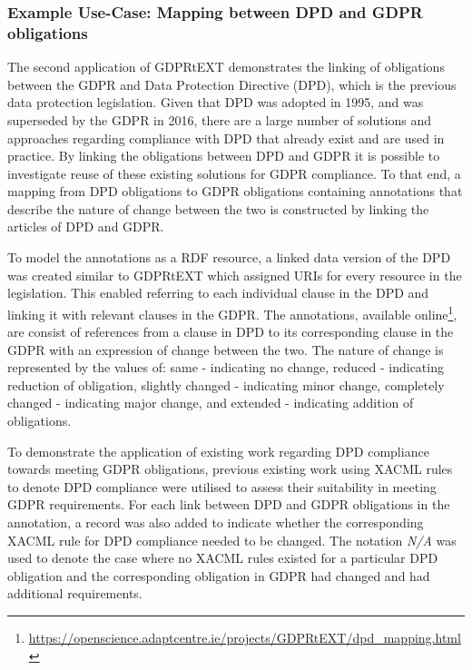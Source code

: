 \subsubsection{Example Use-Case: Mapping between DPD and GDPR obligations}
The second application of GDPRtEXT demonstrates the linking of obligations between the GDPR and Data Protection Directive (DPD), which is the previous data protection legislation. Given that DPD was adopted in 1995, and was superseded by the GDPR in 2016, there are a large number of solutions and approaches regarding compliance with DPD that already exist and are used in practice. By linking the obligations between DPD and GDPR it is possible to investigate reuse of these existing solutions for GDPR compliance. To that end, a mapping from DPD obligations to GDPR obligations containing annotations that describe the nature of change between the two is constructed by linking the articles of DPD and GDPR.

To model the annotations as a RDF resource, a linked data version of the DPD was created similar to GDPRtEXT which assigned URIs for every resource in the legislation. This enabled referring to each individual clause in the DPD and linking it with relevant clauses in the GDPR. 
The annotations, available online\footnote{\url{https://openscience.adaptcentre.ie/projects/GDPRtEXT/dpd_mapping.html}}, are consist of references from a clause in DPD to its corresponding clause in the GDPR with an expression of change between the two. The nature of change is represented by the values of: same - indicating no change, reduced - indicating reduction of obligation, slightly changed - indicating minor change, completely changed - indicating major change, and extended - indicating addition of obligations.

To demonstrate the application of existing work regarding DPD compliance towards meeting GDPR obligations, previous existing work using XACML rules to denote DPD compliance \cite{}\cite{} were utilised to assess their suitability in meeting GDPR requirements.
For each link between DPD and GDPR obligations in the annotation, a record was also added to indicate whether the corresponding XACML rule for DPD compliance needed to be changed. The notation \textit{N/A} was used to denote the case where no XACML rules existed for a particular DPD obligation and the corresponding obligation in GDPR had changed and had additional requirements. 

